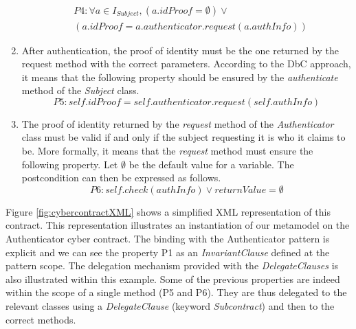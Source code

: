 \begin{enumerate}
    \begin{equation*}
    \begin{split}
        &P4: \forall a \in I_{Subject}, (a.idProof = \emptyset) \lor \\&(a.idProof = a.authenticator.request(a.authInfo))
    \end{split}
    \end{equation*}
    \item After authentication, the proof of identity must be the one returned by the request method with the correct parameters. According to the DbC approach, it means that the following property should be ensured by the \textit{authenticate} method of the \textit{Subject} class.
    \begin{equation*}
        P5: self.idProof = self.authenticator.request(self.authInfo)
    \end{equation*}
    \item The proof of identity returned by the \textit{request} method of the \textit{Authenticator} class must be valid if and only if the subject requesting it is who it claims to be. More formally, it means that the \textit{request} method must ensure the following property. Let $\emptyset$ be the default value for a variable. The postcondition can then be expressed as follows.
    \begin{equation*}
        P6: self.check(authInfo) \lor returnValue = \emptyset
    \end{equation*}
\end{enumerate}

Figure \ref{fig:cybercontractXML} shows a simplified XML representation of this contract.
This representation illustrates an instantiation of our metamodel on the Authenticator cyber contract. The binding with the Authenticator pattern is explicit and we can see the property P1 as an \textit{InvariantClause} defined at the pattern scope.
The delegation mechanism provided with the \textit{DelegateClauses} is also illustrated within this example. Some of the previous properties are indeed within the scope of a single method (P5 and P6). They are thus delegated to the relevant classes using a \textit{DelegateClause} (keyword \textit{Subcontract}) and then to the correct methods.

